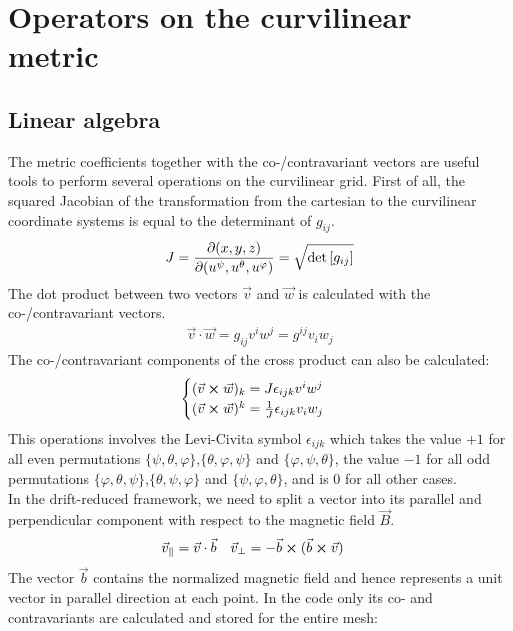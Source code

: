 \chapter{Operators on the curvilinear metric}
\label{app:CurvilinearMetric}

\section{Linear algebra}
\label{app:linearAlgebra}

The metric coefficients together with the co-/contravariant vectors are useful tools to perform several operations on the curvilinear grid. First of all, the squared Jacobian of the transformation from the cartesian to the curvilinear coordinate systems is equal to the determinant of $g_{ij}$. 
\begin{align}
	J = \pdv{(x,y,z)}{(u^\psi, u^\theta, u^\varphi)} = \sqrt{\det\left[g_{ij}\right]} \label{eq:MetricJacobian}
\end{align}
The dot product between two vectors $\vec{v}$ and $\vec{w}$ is calculated with the co-/contravariant vectors.
\begin{align}
	\vec{v}\cdot\vec{w} = g_{ij}v^iw^j = g^{ij}v_iw_j \label{eq:MetricDotProduct}
\end{align}
The co-/contravariant components of the cross product can also be calculated: 
\begin{align}
	\begin{cases}
		(\vec{v} \cross \vec{w})_k = J\epsilon_{ijk}v^iw^j \\
		(\vec{v} \cross \vec{w})^k = \frac{1}{J}\epsilon_{ijk}v_iw_j
	\end{cases} \label{eq:MetricCrossProduct}
\end{align}
This operations involves the Levi-Civita symbol $\epsilon_{ijk}$ which takes the value $+1$ for all even permutations $\{\psi,\theta,\varphi\}$,$\{\theta,\varphi,\psi\}$ and $\{\varphi,\psi,\theta\}$, the value $-1$ for all odd permutations $\{\varphi,\theta,\psi\}$,$\{\theta,\psi,\varphi\}$ and $\{\psi,\varphi,\theta\}$, and is $0$ for all other cases. \\
In the drift-reduced framework, we need to split a vector into its parallel and perpendicular component with respect to the magnetic field $\vec{B}$.
\begin{align}
	\vec{v}_\parallel &= \vec{v}\cdot\vec{b} & \vec{v}_\perp &= -\vec{b}\cross (\vec{b}\cross\vec{v}) \label{eq:MetricParalPerpVecComponents}
\end{align}
The vector $\vec{b}$ contains the normalized magnetic field and hence represents a unit vector in parallel direction at each point. In the code only its co- and contravariants are calculated and stored for the entire mesh: 

